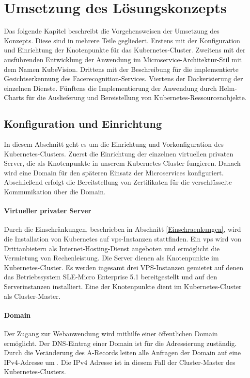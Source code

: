 \chapter{Umsetzung des Lösungskonzepts}

Das folgende Kapitel beschreibt die Vorgehensweisen der Umsetzung des Konzepts.
Diese sind in mehrere Teile gegliedert.
Erstens mit der Konfiguration und Einrichtung der Knotenpunkte für das Kubernetes-Cluster.
Zweitens mit der ausführenden Entwicklung der Anwendung im Microservice-Architektur-Stil mit dem Namen KubeVision.
Drittens mit der Beschreibung für die implementierte Gesichtserkennung des Facerecognition-Services.
Viertens der Dockerisierung der einzelnen Dienste.
Fünftens die Implementierung der Anwendung durch Helm-Charts für die Auslieferung und Bereistellung von Kubernetes-Ressourcenobjekte. 

\section{Konfiguration und Einrichtung}\label{konfig}

In diesem Abschnitt geht es um die Einrichtung und Vorkonfiguration des Kubernetes-Clusters.
Zuerst die Einrichtung der einzelnen virtuellen privaten Server, die als Knotenpunkte in unserem Kubernetes-Cluster fungieren.
Danach wird eine Domain für den späteren Einsatz der Microservices konfiguriert.
Abschließend erfolgt die Bereitstellung von Zertifikaten für die verschlüsselte Kommunikation über die Domain.

\subsubsection{Virtueller privater Server}

Durch die Einschränkungen, beschrieben in Abschnitt \ref{Einschraenkungen}, wird die Installation von Kubernetes auf \ac{vps}-Instanzen stattfinden.
Ein \acs{vps} wird von Drittanbietern als Internet-Hosting-Dienst angeboten und ermöglicht die Vermietung von Rechenleistung.
Die Server dienen als Knotenpunkte im Kubernetes-Cluster.
Es werden ingesamt drei VPS-Instanzen gemietet auf denen das Betriebssystem SLE-Micro Enterprise 5.1 bereitgestellt und auf den Serverinstanzen installiert.
Eine der Knotenpunkte dient im Kubernetes-Cluster als Cluster-Master.

\subsubsection{Domain}\label{Domain}
Der Zugang zur Webanwendung wird mithilfe einer öffentlichen Domain ermöglicht.
Der DNS-Eintrag einer Domain ist für die Adressierung zuständig.
Durch die Veränderung des A-Records leiten alle Anfragen der Domain auf eine IPv4-Adresse um \cite{LearningCoreDNS}.
Die IPv4 Adresse ist in diesem Fall der Cluster-Master des Kubernetes-Clusters.

